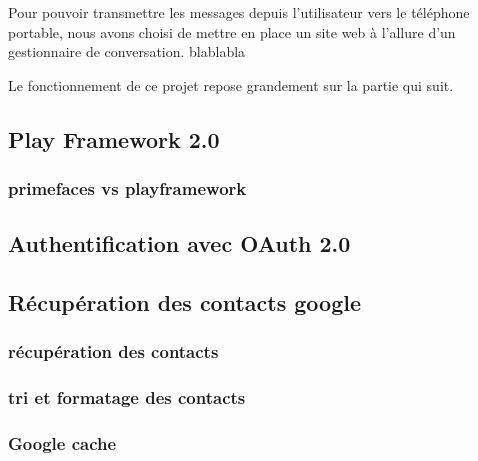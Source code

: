 Pour pouvoir transmettre les messages depuis l'utilisateur vers le téléphone portable, nous avons
choisi de mettre en place un site web à l'allure d'un gestionnaire de conversation. 
blablabla

Le fonctionnement de ce projet repose grandement sur la partie qui suit.


\subsection{Play Framework 2.0}

\subsubsection{primefaces vs playframework}



\subsection{Authentification avec OAuth 2.0}



\subsection{Récupération des contacts google}



\subsubsection{récupération des contacts}

\subsubsection{tri et formatage des contacts}

\subsubsection{Google cache}



